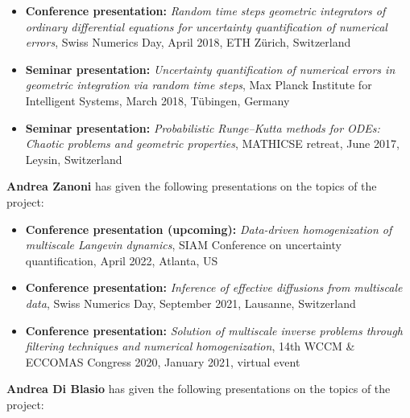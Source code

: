 \documentclass[10pt]{article}
\begin{document}
\begin{itemize}
	\item \textbf{Conference presentation:} \textit{Random time steps geometric integrators of ordinary differential equations for uncertainty quantification of numerical errors}, Swiss Numerics Day, April 2018, ETH Zürich, Switzerland
	\item \textbf{Seminar presentation:} \textit{Uncertainty quantification of numerical errors in geometric integration via random time steps}, Max Planck Institute for Intelligent Systems, March 2018, Tübingen, Germany 
	\item \textbf{Seminar presentation:} \textit{Probabilistic Runge--Kutta methods for ODEs: Chaotic problems and geometric properties}, MATHICSE retreat, June 2017, Leysin, Switzerland
\end{itemize}
%
\textbf{Andrea Zanoni} has given the following presentations on the topics of the project:
\begin{itemize}
	\item \textbf{Conference presentation (upcoming):} \textit{Data-driven homogenization of multiscale Langevin dynamics}, SIAM Conference on uncertainty quantification, April 2022, Atlanta, US
	\item \textbf{Conference presentation:} \textit{Inference of effective diffusions from multiscale data}, Swiss Numerics Day, September 2021, Lausanne, Switzerland
	\item \textbf{Conference presentation:} \textit{Solution of multiscale inverse problems through filtering techniques and numerical homogenization}, 14th WCCM \& ECCOMAS Congress 2020, January 2021, virtual event
\end{itemize}
%
\textbf{Andrea Di Blasio} has given the following presentations on the topics of the project:
\end{document}
